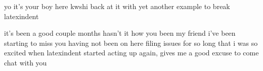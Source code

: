 \begin{myenv}
  yo it's your boy here kwshi back at it with yet another example to break latexindent
\end{myenv}
it's been a good couple months hasn't it how you been my friend i've been starting to miss you having not been on here filing issues for so long that i was so excited when latexindent started acting up again, gives me a good excuse to come chat with you
